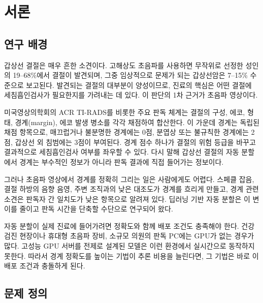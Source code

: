 \chapter{서론}\label{ch:intro}

\section{연구 배경}\label{sec:background}

갑상선 결절은 매우 흔한 소견이다. 고해상도 초음파를 사용하면 무작위로 선정한 성인의 19--68\%에서
결절이 발견되며, 그중 임상적으로 문제가 되는 갑상선암은 7--15\% 수준으로 보고된다\citep{haugen2016ata}.
발견되는 결절의 대부분이 양성이므로, 진료의 핵심은 어떤 결절에 세침흡인검사가 필요한지를
가려내는 데 있다. 이 판단의 1차 근거가 초음파 영상이다.

미국영상의학회의 ACR TI-RADS를 비롯한 주요 판독 체계는 결절의 구성, 에코, 형태, 경계(margin),
에코 발생 병소를 각각 채점하여 합산한다\citep{tessler2017tirads}. 이 가운데 경계는 독립된 채점
항목으로, 매끄럽거나 불분명한 경계에는 0점, 분엽상 또는 불규칙한 경계에는 2점,
갑상선 외 침범에는 3점이 부여된다. 경계 점수 하나가 결절의 위험 등급을 바꾸고 결과적으로
세침흡인검사 여부를 좌우할 수 있다. 다시 말해 갑상선 결절의 자동 분할에서 경계는 부수적인
정보가 아니라 판독 결과에 직접 들어가는 정보이다.

그러나 초음파 영상에서 경계를 정확히 그리는 일은 사람에게도 어렵다. 스페클 잡음, 결절 하방의
음향 음영, 주변 조직과의 낮은 대조도가 경계를 흐리게 만들고, 경계 관련 소견은 판독자 간
일치도가 낮은 항목으로 알려져 있다\citep{hoang2018interobserver}. 딥러닝 기반 자동 분할은
이 변이를 줄이고 판독 시간을 단축할 수단으로 연구되어 왔다\citep{ronneberger2015unet,gong2021multitask,gong2023trfe}.

자동 분할이 실제 진료에 들어가려면 정확도와 함께 배포 조건도 충족해야 한다. 건강검진 현장이나
휴대형 초음파 장비, 소규모 의원의 판독 PC에는 GPU가 없는 경우가 많다. 고성능 GPU 서버를
전제로 설계된 모델은 이런 환경에서 실시간으로 동작하지 못한다. 따라서 경계 정확도를 높이는
기법이 추론 비용을 늘린다면, 그 기법은 바로 이 배포 조건과 충돌하게 된다.

\section{문제 정의}\label{sec:problem}

